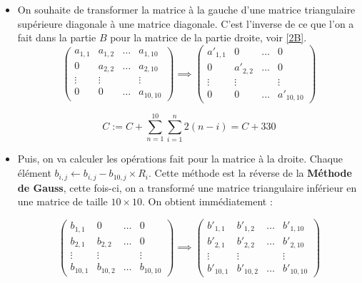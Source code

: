 \documentclass{article}
\begin{document}
\begin{itemize}
    \item On souhaite de transformer la matrice à la gauche d'une matrice triangulaire supérieure diagonale à une matrice diagonale. C'est l'inverse de ce que l'on a fait dans la partie $B$ pour la matrice de la partie droite, voir \ref{2B}.  
        \[
            \begin{pmatrix} a_{1,1} & a_{1,2}& \ldots & a_{1, 10}\\
                0 & a_{2,2} & \ldots & a_{2, 10}\\
                \vdots & \vdots & & \vdots\\
                0 & 0 & \ldots & a_{10, 10}
            \end{pmatrix} \implies \begin{pmatrix} 
                a'_{1, 1} & 0 & \ldots & 0 \\
                0 & a'_{2, 2} & \ldots & 0 \\
                \vdots & \vdots & & \vdots\\
                0 & 0 & \ldots & a'_{10, 10}
            \end{pmatrix} 
        \]
            
        \begin{tcolorbox}
        \[
        C := C +  \sum_{n=1}^{10} \sum_{i=1}^{n} 2(n-i) = C + 330
        \]
        \end{tcolorbox}
        
    \item Puis, on va calculer les opérations fait pour la matrice à la droite. Chaque élément $b_{i,j} \leftarrow b_{i,j} - b_{10,j} \times R_i$. Cette méthode est la réverse de la \textbf{Méthode de Gauss}, cette fois-ci, on a transformé une matrice triangulaire inférieur en une matrice de taille $10 \times 10$. On obtient immédiatement : 

        \[
            \begin{pmatrix} b_{1,1} & 0 & \ldots & 0 \\
                b_{2,1} & b_{2,2} & \ldots & 0 \\
                \vdots & \vdots & & \vdots\\
                b_{10,1} & b_{10,2} & \ldots & b_{10,10}
            \end{pmatrix} \implies 
            \begin{pmatrix} 
                b'_{1,1} & b'_{1,2} & \ldots & b'_{1, 10}\\
                b'_{2,1} & b'_{2,2} & \ldots & b'_{2, 10}\\
                \vdots & \vdots & & \vdots\\
                b'_{10,1} & b'_{10, 2} & \ldots & b'_{10, 10}
            \end{pmatrix} 
        \]
        

\end{itemize}
\end{document}
